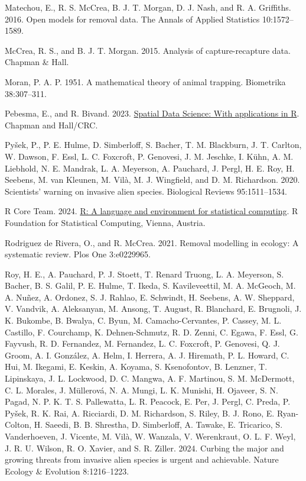 \documentclass[
  11pt,
  a4paper,
]{article}
\newlength{\cslhangindent}
\newenvironment{CSLReferences}[2] %
 {\begin{list}{}{%
  \setlength{\itemindent}{0pt}
  \setlength{\leftmargin}{0pt}
  \setlength{\parsep}{0pt}
  \ifodd #1
   \setlength{\leftmargin}{\cslhangindent}
   \setlength{\itemindent}{-1\cslhangindent}
  \fi
  \setlength{\itemsep}{#2\baselineskip}}}
 {\end{list}}
\begin{document}
\begin{CSLReferences}{1}{0}
Matechou, E., R. S. McCrea, B. J. T. Morgan, D. J. Nash, and R. A. Griffiths. 2016. {Open models for removal data}. The Annals of Applied Statistics 10:1572--1589.

McCrea, R. S., and B. J. T. Morgan. 2015. Analysis of capture-recapture data. Chapman \& Hall.

Moran, P. A. P. 1951. A mathematical theory of animal trapping. Biometrika 38:307--311.

Pebesma, E., and R. Bivand. 2023. \href{https://doi.org/10.1201/9780429459016}{{Spatial Data Science: With applications in R}}. {Chapman and Hall/CRC}.

Pyšek, P., P. E. Hulme, D. Simberloff, S. Bacher, T. M. Blackburn, J. T. Carlton, W. Dawson, F. Essl, L. C. Foxcroft, P. Genovesi, J. M. Jeschke, I. Kühn, A. M. Liebhold, N. E. Mandrak, L. A. Meyerson, A. Pauchard, J. Pergl, H. E. Roy, H. Seebens, M. van Kleunen, M. Vilà, M. J. Wingfield, and D. M. Richardson. 2020. Scientists' warning on invasive alien species. Biological Reviews 95:1511--1534.

R Core Team. 2024. \href{https://www.R-project.org/}{R: A language and environment for statistical computing}. R Foundation for Statistical Computing, Vienna, Austria.

Rodriguez de Rivera, O., and R. McCrea. 2021. Removal modelling in ecology: A systematic review. Plos One 3:e0229965.

Roy, H. E., A. Pauchard, P. J. Stoett, T. Renard Truong, L. A. Meyerson, S. Bacher, B. S. Galil, P. E. Hulme, T. Ikeda, S. Kavileveettil, M. A. McGeoch, M. A. Nuñez, A. Ordonez, S. J. Rahlao, E. Schwindt, H. Seebens, A. W. Sheppard, V. Vandvik, A. Aleksanyan, M. Ansong, T. August, R. Blanchard, E. Brugnoli, J. K. Bukombe, B. Bwalya, C. Byun, M. Camacho-Cervantes, P. Cassey, M. L. Castillo, F. Courchamp, K. Dehnen-Schmutz, R. D. Zenni, C. Egawa, F. Essl, G. Fayvush, R. D. Fernandez, M. Fernandez, L. C. Foxcroft, P. Genovesi, Q. J. Groom, A. I. González, A. Helm, I. Herrera, A. J. Hiremath, P. L. Howard, C. Hui, M. Ikegami, E. Keskin, A. Koyama, S. Ksenofontov, B. Lenzner, T. Lipinskaya, J. L. Lockwood, D. C. Mangwa, A. F. Martinou, S. M. McDermott, C. L. Morales, J. Müllerová, N. A. Mungi, L. K. Munishi, H. Ojaveer, S. N. Pagad, N. P. K. T. S. Pallewatta, L. R. Peacock, E. Per, J. Pergl, C. Preda, P. Pyšek, R. K. Rai, A. Ricciardi, D. M. Richardson, S. Riley, B. J. Rono, E. Ryan-Colton, H. Saeedi, B. B. Shrestha, D. Simberloff, A. Tawake, E. Tricarico, S. Vanderhoeven, J. Vicente, M. Vilà, W. Wanzala, V. Werenkraut, O. L. F. Weyl, J. R. U. Wilson, R. O. Xavier, and S. R. Ziller. 2024. Curbing the major and growing threats from invasive alien species is urgent and achievable. Nature Ecology \& Evolution 8:1216--1223.


\end{CSLReferences}
\end{document}
